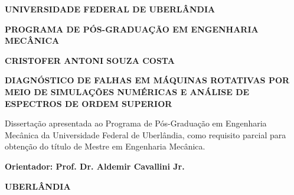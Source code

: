 
\begin{titlepage}
    \centering
    
    
    \vspace{2cm}
    
    {\Large \textbf{UNIVERSIDADE FEDERAL DE UBERLÂNDIA}}
    
    \vspace{0.5cm}
    
    {\large \textbf{PROGRAMA DE PÓS-GRADUAÇÃO EM ENGENHARIA MECÂNICA}}
    
    \vspace{2cm}
    
    {\Large \textbf{CRISTOFER ANTONI SOUZA COSTA}}
    
    \vspace{2cm}
    
    {\Large \textbf{DIAGNÓSTICO DE FALHAS EM MÁQUINAS ROTATIVAS POR MEIO DE SIMULAÇÕES NUMÉRICAS E ANÁLISE DE ESPECTROS DE ORDEM SUPERIOR}}
    
    \vspace{2cm}
    
    \begin{flushright}
        \begin{minipage}{0.6\textwidth}
            Dissertação apresentada ao Programa de Pós-Graduação em Engenharia Mecânica da Universidade Federal de Uberlândia, como requisito parcial para obtenção do título de Mestre em Engenharia Mecânica.
        \end{minipage}
    \end{flushright}
    
    \vspace{2cm}
    
    {\large \textbf{Orientador: Prof. Dr. Aldemir Cavallini Jr.}}
    
    \vfill
    
    {\large \textbf{UBERLÂNDIA}}
    
    {\large \textbf{\the\year}}
    
\end{titlepage}

\cleardoublepage

